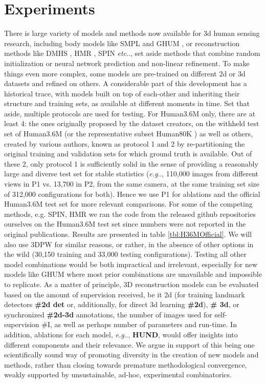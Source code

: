 \documentclass[final]{cvpr}
\makeatletter
\DeclareRobustCommand\onedot{\futurelet\@let@token\@onedot}
\def\@onedot{\ifx\@let@token.\else.\null\fi\xspace}
\def\eg{\emph{e.g}\onedot} \def\Eg{\emph{E.g}\onedot}
\def\etc{\emph{etc}\onedot} \def\vs{\emph{vs}\onedot}
\makeatother
\begin{document}
\section{Experiments}\label{sec:exps}

 There is large variety of models and methods now available for 3d human sensing research, including body models like SMPL \cite{SMPL2015} and GHUM \cite{ghum2020}, or reconstruction methods like DMHS \cite{dmhs_cvpr17}, HMR \cite{Kanazawa2018}, SPIN \cite{kolotouros2019learning} \etc, set aside methods that combine random initialization or neural network prediction and non-linear refinement\cite{bogo2016,zanfir17}. To make things even more complex, some models are pre-trained on different 2d or 3d datasets and refined on others. A considerable part of this development has a historical trace, with models built on top of each-other and inheriting their structure and training sets, as available at different moments in time. 
Set that aside, multiple protocols are used for testing. For Human3.6M \cite{Ionescu14pami} only, there are at least 4: the ones originally proposed by the dataset creators, on the withheld test set of Human3.6M (or the representative subset Human80K \cite{Ionescu14}) as well as others, created by various authors, known as protocol 1 and 2 by re-partitioning the original training and validation sets for which ground truth is available. Out of these 2, only protocol 1 is sufficiently solid in the sense of providing a reasonably large and diverse test set for stable statistics (\eg, 110,000 images from different views in P1 vs. 13,700 in P2, from the same camera, at the same training set size of 312,000 configurations for both). Hence we use P1 for ablations and the official Human3.6M test set for more relevant comparisons. For some of the competing methods, e.g. SPIN\cite{kolotouros2019learning}, HMR\cite{Kanazawa2018} we ran the code from the released github repositories ourselves on the Human3.6M test set since numbers were not reported in the original publications. Results are presented in table \ref{tbl:H36MOfficial}. We will also use 3DPW \cite{vonMarcard2018} for similar reasons, or rather, in the absence of other options in the wild (30,150 training and 33,000 testing configurations). Testing all other model combinations would be both impractical and irrelevant, especially for new models like GHUM where most prior combinations are unavailable and impossible to replicate. As a matter of principle, 3D reconstruction models can be evaluated based on the amount of supervision received, be it 2d (for training landmark detectors {\bf \#2d det} or, additionally, for direct 3d learning {\bf \#2d}), {\bf \# 3d}, or synchronized {\bf \#2d-3d} annotations, the number of images used for self-supervision \#I, as well as perhaps number of parameters and run-time. In addition, ablations for each model, \eg, {\bf HUND}, would offer insights into different components and their relevance. We argue in support of this being one scientifically sound way of promoting diversity in the creation of new models and methods, rather than closing towards premature methodological convergence, weakly supported by unsustainable, ad-hoc, experimental combinatorics.
\end{document}
